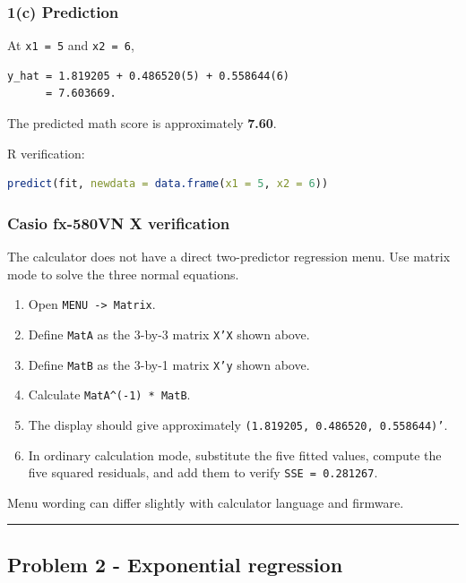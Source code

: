 ﻿\documentclass[11pt]{article}
\begin{document}
\subsubsection{1(c) Prediction}

At \texttt{x1 = 5} and \texttt{x2 = 6},

\begin{lstlisting}
y_hat = 1.819205 + 0.486520(5) + 0.558644(6)
      = 7.603669.
\end{lstlisting}

The predicted math score is approximately \textbf{7.60}.

R verification:

\begin{lstlisting}[language=R]
predict(fit, newdata = data.frame(x1 = 5, x2 = 6))
\end{lstlisting}

\subsubsection{Casio fx-580VN X verification}

The calculator does not have a direct two-predictor regression menu. Use matrix
mode to solve the three normal equations.

\begin{enumerate}
\item Open \texttt{MENU -> Matrix}.
\item Define \texttt{MatA} as the 3-by-3 matrix \texttt{X'X} shown above.
\item Define \texttt{MatB} as the 3-by-1 matrix \texttt{X'y} shown above.
\item Calculate \texttt{MatA\textasciicircum{}(-1) * MatB}.
\item The display should give approximately \texttt{(1.819205, 0.486520, 0.558644)'}.
\item In ordinary calculation mode, substitute the five fitted values, compute the
five squared residuals, and add them to verify \texttt{SSE = 0.281267}.
\end{enumerate}

Menu wording can differ slightly with calculator language and firmware.

\medskip\hrule\medskip

\subsection{Problem 2 - Exponential regression}
\end{document}
